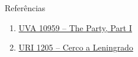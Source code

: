 \begin{frame}[fragile]{Referências}

    \begin{enumerate}
        \item \href{https://uva.onlinejudge.org/index.php?option=com_onlinejudge&Itemid=8&category=24&page=show_problem&problem=1900}{UVA 10959 -- The Party, Part I}

        \item \href{https://www.urionlinejudge.com.br/judge/pt/problems/view/1205}{URI 1205 -- Cerco a Leningrado}

    \end{enumerate}

\end{frame}
